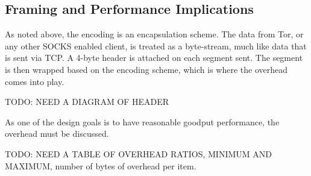 \subsection{Framing and Performance Implications}
As noted above, the encoding is an encapsulation scheme. The data from Tor, or any other SOCKS enabled client, is treated as a byte-stream, much like data that is sent via TCP. A 4-byte header is attached on each segment sent. The segment is then wrapped based on the encoding scheme, which is where the overhead comes into play.


TODO: NEED A DIAGRAM OF HEADER


As one of the design goals is to have reasonable goodput performance, the overhead must be discussed. 


TODO: NEED A TABLE OF OVERHEAD RATIOS, MINIMUM AND MAXIMUM, number of bytes of overhead per item.
